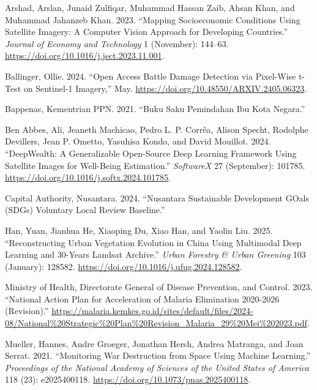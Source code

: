 \documentclass[
  letterpaper,
  DIV=11,
  numbers=noendperiod]{scrreprt}
\newlength{\cslhangindent}
\newlength{\cslentryspacingunit} %
\newenvironment{CSLReferences}[2] %
 {%
  \setlength{\parindent}{0pt}
  \ifodd #1
  \let\oldpar\par
  \def\par{\hangindent=\cslhangindent\oldpar}
  \fi
  \setlength{\parskip}{#2\cslentryspacingunit}
 }%
 {}
\begin{document}
\hypertarget{refs}{}
\begin{CSLReferences}{1}{0}
\leavevmode{}%
Arshad, Arslan, Junaid Zulfiqar, Muhammad Hassan Zaib, Ahsan Khan, and
Muhammad Jahanzeb Khan. 2023. {``Mapping Socioeconomic Conditions Using
Satellite Imagery: A Computer Vision Approach for Developing
Countries.''} \emph{Journal of Economy and Technology} 1 (November):
144--63. \url{https://doi.org/10.1016/j.ject.2023.11.001}.

\leavevmode{}%
Ballinger, Ollie. 2024. {``Open Access Battle Damage Detection via
Pixel-Wise t-Test on Sentinel-1 Imagery,''} May.
\url{https://doi.org/10.48550/ARXIV.2405.06323}.

\leavevmode{}%
Bappenas, Kementrian PPN. 2021. {``Buku Saku Pemindahan Ibu Kota
Negara.''}

\leavevmode{}%
Ben Abbes, Ali, Jeaneth Machicao, Pedro L. P. Corrêa, Alison Specht,
Rodolphe Devillers, Jean P. Ometto, Yasuhisa Kondo, and David Mouillot.
2024. {``DeepWealth: A Generalizable Open-Source Deep Learning Framework
Using Satellite Images for Well-Being Estimation.''} \emph{SoftwareX} 27
(September): 101785. \url{https://doi.org/10.1016/j.softx.2024.101785}.

\leavevmode{}%
Capital Authority, Nusantara. 2024. {``Nusantara Sustainable Development
GOals (SDGs) Voluntary Local Review Baseline.''}

\leavevmode{}%
Han, Yuan, Jianhua He, Xiaoping Du, Xiao Han, and Yaolin Liu. 2025.
{``Reconstructing Urban Vegetation Evolution in China Using Multimodal
Deep Learning and 30-Years Landsat Archive.''} \emph{Urban Forestry \&
Urban Greening} 103 (January): 128582.
\url{https://doi.org/10.1016/j.ufug.2024.128582}.

\leavevmode{}%
Ministry of Health, Directorate General of Disease Prevention, and
Control. 2023. {``National Action Plan for Acceleration of Malaria
Elimination 2020-2026 (Revision).''}
\url{https://malaria.kemkes.go.id/sites/default/files/2024-08/National\%20Strategic\%20Plan\%20Revision_Malaria_29\%20Mei\%202023.pdf}.

\leavevmode{}%
Mueller, Hannes, Andre Groeger, Jonathan Hersh, Andrea Matranga, and
Joan Serrat. 2021. {``Monitoring War Destruction from Space Using
Machine Learning.''} \emph{Proceedings of the National Academy of
Sciences of the United States of America} 118 (23): e2025400118.
\url{https://doi.org/10.1073/pnas.2025400118}.


\end{CSLReferences}
\end{document}
